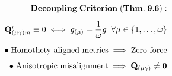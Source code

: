\documentclass[preview]{standalone}
\begin{document}
\begin{align*}
\special{dvisvgm:raw <g id='unique000'>}\mathbf{Decoupling\;Criterion\;(Thm.\;9.6):}\\[5pt]\mathbf{Q}_{(\mu\gamma)m}^i \equiv 0 \iff g_{(\mu)} = \frac{1}{\omega}g\;\;\forall\mu\in\{1,\dots,\omega\}\\[6pt]\bullet\;\text{Homothety-aligned metrics}\implies\text{Zero force}\\[4pt]\bullet\;\text{Anisotropic misalignment}\implies\mathbf{Q}_{(\mu\gamma)}\ne\mathbf{0}\special{dvisvgm:raw </g>}
\end{align*}
\end{document}
